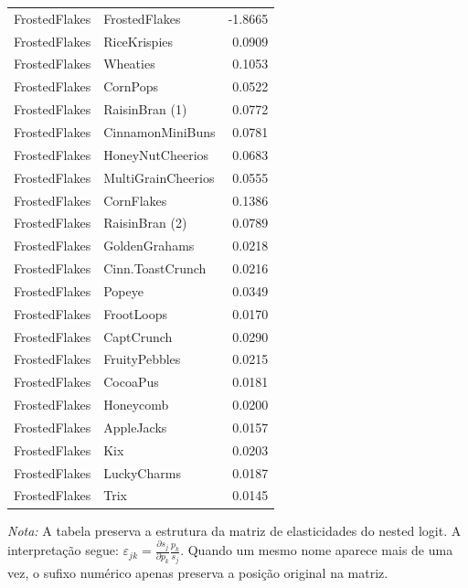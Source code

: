 \begin{table}[H]
\begin{tabular}{llr}
FrostedFlakes & FrostedFlakes & -1.8665 \\
FrostedFlakes & RiceKrispies & 0.0909 \\
FrostedFlakes & Wheaties & 0.1053 \\
FrostedFlakes & CornPops & 0.0522 \\
FrostedFlakes & RaisinBran (1) & 0.0772 \\
FrostedFlakes & CinnamonMiniBuns & 0.0781 \\
FrostedFlakes & HoneyNutCheerios & 0.0683 \\
FrostedFlakes & MultiGrainCheerios & 0.0555 \\
FrostedFlakes & CornFlakes & 0.1386 \\
FrostedFlakes & RaisinBran (2) & 0.0789 \\
FrostedFlakes & GoldenGrahams & 0.0218 \\
FrostedFlakes & Cinn.ToastCrunch & 0.0216 \\
FrostedFlakes & Popeye & 0.0349 \\
FrostedFlakes & FrootLoops & 0.0170 \\
FrostedFlakes & CaptCrunch & 0.0290 \\
FrostedFlakes & FruityPebbles & 0.0215 \\
FrostedFlakes & CocoaPus & 0.0181 \\
FrostedFlakes & Honeycomb & 0.0200 \\
FrostedFlakes & AppleJacks & 0.0157 \\
FrostedFlakes & Kix & 0.0203 \\
FrostedFlakes & LuckyCharms & 0.0187 \\
FrostedFlakes & Trix & 0.0145 \\
\bottomrule
\end{tabular}

\vspace{0.3em}
\footnotesize
\textit{Nota:} A tabela preserva a estrutura da matriz de elasticidades do nested logit. A interpretação segue: $\varepsilon_{jk}=\frac{\partial s_j}{\partial p_k}\frac{p_k}{s_j}$. Quando um mesmo nome aparece mais de uma vez, o sufixo numérico apenas preserva a posição original na matriz.
\end{table}
\endgroup



